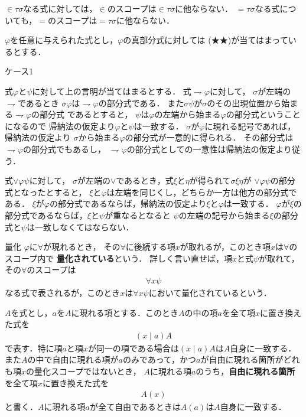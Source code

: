 	$\in \tau \sigma$なる式に対しては，$\in$のスコープは$\in \tau \sigma$に他ならない．
	$= \tau \sigma$なる式についても，$=$のスコープは$= \tau \sigma$に他ならない．
	
	$\varphi$を任意に与えられた式とし，$\varphi$の真部分式に対しては
	(★★)が当てはまっているとする．
	
	\begin{description}
		\item[ケース1] 
	\end{description}
	式$\varphi$と$\psi$に対して上の言明が当てはまるとする．
	式$\rightharpoondown \varphi$に対して，
	$\sigma$が左端の$\rightharpoondown$であるとき
	$\sigma \varphi$は$\rightharpoondown \varphi$の部分式である．
	また$\sigma \psi$が$\sigma$のその出現位置から始まる$\rightharpoondown \varphi$の部分式
	であるとすると，
	$\psi$は$\varphi$の左端から始まる$\varphi$の部分式ということになるので
	帰納法の仮定より$\varphi$と$\psi$は一致する．
	$\sigma$が$\varphi$に現れる記号であれば，帰納法の仮定より
	$\sigma$から始まる$\varphi$の部分式が一意的に得られる．
	その部分式は$\rightharpoondown \varphi$の部分式でもあるし，
	$\rightharpoondown \varphi$の部分式としての一意性は帰納法の仮定より従う．
	
	式$\vee \varphi \psi$に対して，
	$\sigma$が左端の$\vee$であるとき，式$\xi$と$\eta$が得られて$\sigma \xi \eta$が
	$\vee \varphi \psi$の部分式となったとすると，
	$\xi$と$\varphi$は左端を同じくし，どちらか一方は他方の部分式である．
	$\xi$が$\varphi$の部分式であるならば，帰納法の仮定より$\xi$と$\varphi$は一致する．
	$\varphi$が$\xi$の部分式であるならば，$\xi$と$\psi$が重なるとなると
	$\psi$の左端の記号から始まる$\xi$の部分式と$\psi$は一致しなくてはならない．
	
	\begin{itembox}[l]{量化}
		$\varphi$に$\forall$が現れるとき，
		その$\forall$に後続する項$x$が取れるが，このとき項$x$は$\forall$のスコープ内で
		{\bf 量化されている}という．
		詳しく言い直せば，項$x$と式$\psi$が取れて，その$\forall$のスコープは
		\begin{align}
			\forall x \psi
		\end{align}
		なる式で表されるが，このとき$x$は$\forall x \psi$において量化されているという．
	\end{itembox}
	
	$A$を式とし，$a$を$A$に現れる項とする．このとき$A$の中の項$a$を全て項$x$に置き換えた式を
	\begin{align}
		(x \mid a)A
	\end{align}
	で表す．特に項$a$と項$x$が同一の項である場合は$(x \mid a)A$は$A$自身に一致する．
	また$A$の中で自由に現れる項が$a$のみであって，かつ$a$が自由に現れる箇所がどれも項$x$の量化スコープではないとき，
	$A$に現れる項$a$のうち，{\bf 自由に現れる箇所}を全て項$x$に置き換えた式を
	\begin{align}
		A(x)
	\end{align}
	と書く．$A$に現れる項$a$が全て自由であるときは$A(a)$は$A$自身に一致する．
